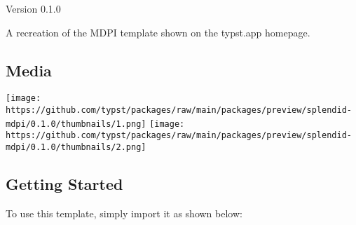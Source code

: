 \label{readme}
Version 0.1.0

A recreation of the MDPI template shown on the typst.app homepage.

\subsection{Media}\label{media}

\texttt{[image: https://github.com/typst/packages/raw/main/packages/preview/splendid-mdpi/0.1.0/thumbnails/1.png]}
\texttt{[image: https://github.com/typst/packages/raw/main/packages/preview/splendid-mdpi/0.1.0/thumbnails/2.png]}

\subsection{Getting Started}\label{getting-started}

To use this template, simply import it as shown below:

